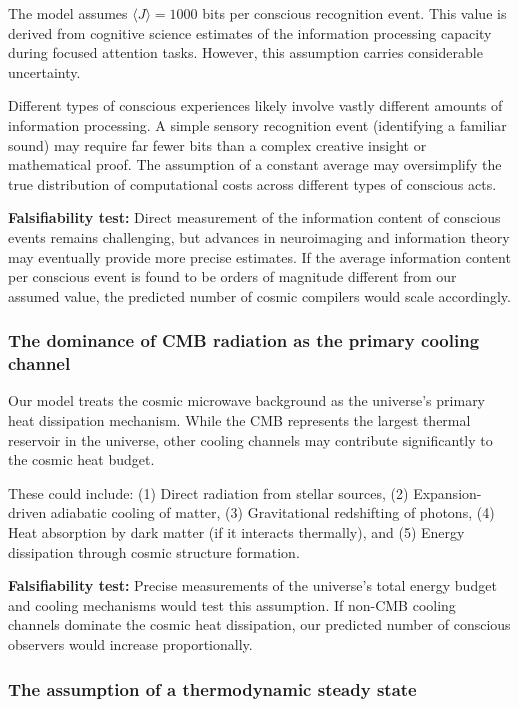 \documentclass[12pt, aip, jcp]{revtex4-2} %
\begin{document}
The model assumes \(\langle J \rangle = 1000\) bits per conscious recognition event. This value is derived from cognitive science estimates of the information processing capacity during focused attention tasks. However, this assumption carries considerable uncertainty.

Different types of conscious experiences likely involve vastly different amounts of information processing. A simple sensory recognition event (identifying a familiar sound) may require far fewer bits than a complex creative insight or mathematical proof. The assumption of a constant average may oversimplify the true distribution of computational costs across different types of conscious acts.

\textbf{Falsifiability test:} Direct measurement of the information content of conscious events remains challenging, but advances in neuroimaging and information theory may eventually provide more precise estimates. If the average information content per conscious event is found to be orders of magnitude different from our assumed value, the predicted number of cosmic compilers would scale accordingly.

\subsubsection{The dominance of CMB radiation as the primary cooling channel}

Our model treats the cosmic microwave background as the universe's primary heat dissipation mechanism. While the CMB represents the largest thermal reservoir in the universe, other cooling channels may contribute significantly to the cosmic heat budget.

These could include: (1) Direct radiation from stellar sources, (2) Expansion-driven adiabatic cooling of matter, (3) Gravitational redshifting of photons, (4) Heat absorption by dark matter (if it interacts thermally), and (5) Energy dissipation through cosmic structure formation.

\textbf{Falsifiability test:} Precise measurements of the universe's total energy budget and cooling mechanisms would test this assumption. If non-CMB cooling channels dominate the cosmic heat dissipation, our predicted number of conscious observers would increase proportionally.

\subsubsection{The assumption of a thermodynamic steady state}
\end{document}

